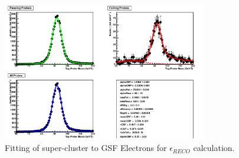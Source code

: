\begin{figure}[htb]
\centering
\includegraphics[width=0.8\textwidth]{Systematics/2012data_outputSCToGsfElectron.png}
\caption{Fitting of super-cluster to GSF Electrons for $\epsilon_{RECO}$ calculation.}
\label{fig:2012data_outputSCToGsfElectron}
\end{figure}





